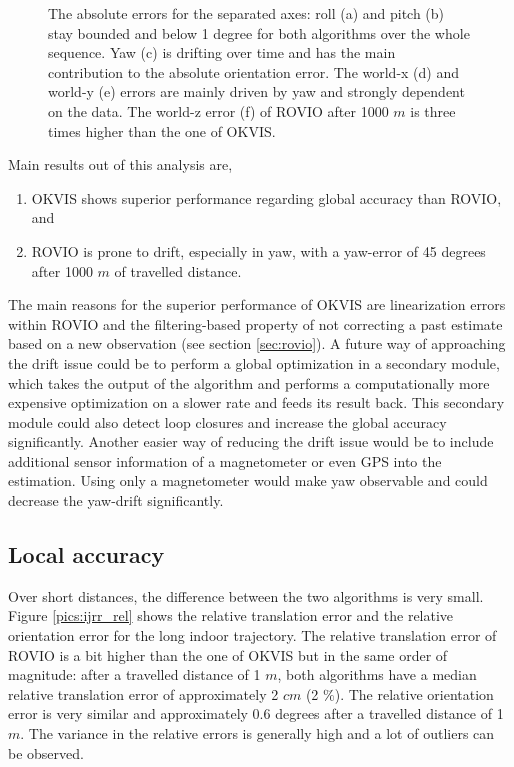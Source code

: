 \begin{figure}[h]
\begin{subfigure}[b]{0.48\textwidth}
    \caption{}
  \end{subfigure}
   \caption{The absolute errors for the separated axes: roll (a) and pitch (b) stay bounded and below 1 degree for both algorithms over the whole sequence. Yaw (c) is drifting over time and has the main contribution to the absolute orientation error. The world-x (d) and world-y (e) errors are mainly driven by yaw and strongly dependent on the data. The world-z error (f) of ROVIO after 1000 $m$ is three times higher than the one of OKVIS.}
   \label{pics:ijrr_abs_separate}
\end{figure}

Main results out of this analysis are,
\begin{enumerate}
\item OKVIS shows superior performance regarding global accuracy than ROVIO, and 
\item ROVIO is prone to drift, especially in yaw, with a yaw-error of 45 degrees after 1000 $m$ of travelled distance.
\end{enumerate}

The main reasons for the superior performance of OKVIS are linearization errors within ROVIO and the filtering-based property of not correcting a past estimate based on a new observation (see section \ref{sec:rovio}). 
A future way of approaching the drift issue could be to perform a global optimization in a secondary module, which takes the output of the algorithm and performs a computationally more expensive optimization on a slower rate and feeds its result back. This secondary module could also detect loop closures and increase the global accuracy significantly. Another easier way of reducing the drift issue would be to include additional sensor information of a magnetometer or even GPS into the estimation. Using only a magnetometer would make yaw observable and could decrease the yaw-drift significantly.


\subsection{Local accuracy}
\label{sec:ijrr_local}

Over short distances, the difference between the two algorithms is very small. Figure \ref{pics:ijrr_rel} shows the relative translation error and the relative orientation error for the long indoor trajectory. The relative translation error of ROVIO is a bit higher than the one of OKVIS but in the same order of magnitude: after a travelled distance of 1 $m$, both algorithms have a median relative translation error of approximately 2 $cm$ (2 $\%$). The relative orientation error is very similar and approximately 0.6 degrees after a travelled distance of 1 $m$. The variance in the relative errors is generally high and a lot of outliers can be observed. \\

